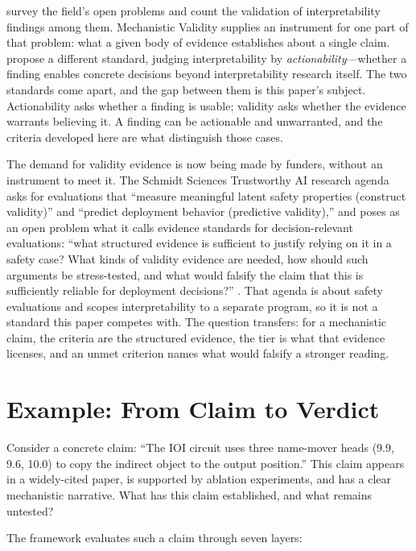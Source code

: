 \documentclass{article}
\begin{document}
\citet{sharkey2025open} survey the field's open problems and count the validation of interpretability findings among them. Mechanistic Validity supplies an instrument for one part of that problem: what a given body of evidence establishes about a single claim. \citet{orgad2026actionable} propose a different standard, judging interpretability by \emph{actionability}---whether a finding enables concrete decisions beyond interpretability research itself. The two standards come apart, and the gap between them is this paper's subject. Actionability asks whether a finding is usable; validity asks whether the evidence warrants believing it. A finding can be actionable and unwarranted, and the criteria developed here are what distinguish those cases.

The demand for validity evidence is now being made by funders, without an instrument to meet it. The Schmidt Sciences Trustworthy AI research agenda asks for evaluations that ``measure meaningful latent safety properties (construct validity)'' and ``predict deployment behavior (predictive validity),'' and poses as an open problem what it calls evidence standards for decision-relevant evaluations: ``what structured evidence is sufficient to justify relying on it in a safety case? What kinds of validity evidence are needed, how should such arguments be stress-tested, and what would falsify the claim that this is sufficiently reliable for deployment decisions?'' \citep{schmidt2026trustworthy}. That agenda is about safety evaluations and scopes interpretability to a separate program, so it is not a standard this paper competes with. The question transfers: for a mechanistic claim, the criteria are the structured evidence, the tier is what that evidence licenses, and an unmet criterion names what would falsify a stronger reading.

\section{Example: From Claim to Verdict}
\label{sec:overview}

Consider a concrete claim: ``The IOI circuit uses three name-mover heads (9.9, 9.6, 10.0) to copy the indirect object to the output position.'' This claim appears in a widely-cited paper, is supported by ablation experiments, and has a clear mechanistic narrative. What has this claim established, and what remains untested?

The framework evaluates such a claim through seven layers:
\end{document}
